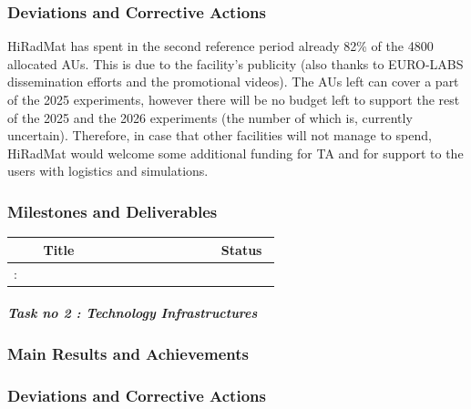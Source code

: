\subsubsection*{Deviations and Corrective Actions}

HiRadMat has spent in the second reference period already 82\% of the 4800 allocated AUs. This is due to the facility's publicity (also thanks to EURO-LABS dissemination efforts and the promotional videos). The AUs left can cover a part of the 2025 experiments, however there will be no budget left to support the rest of the 2025 and the 2026 experiments (the number of which is, currently uncertain). Therefore, in case that other facilities will not manage to spend, HiRadMat would welcome some additional funding for TA and for support to the users with logistics and simulations. 

\subsubsection*{Milestones and Deliverables}

{\fontsize{9}{11}\selectfont
\begin{center}
  \begin{tabular}[t]{!{\color{mygray}\vrule}p{0.10\linewidth}!
  {\color{mygray}\vrule}p{0.60\linewidth}!
  {\color{mygray}\vrule}p{0.20\linewidth}!{\color{mygray}\vrule} } \hline
     & {\bf Title} & {\bf Status} \\ \hline
    : &  &  \\ \hline
  \end{tabular}
\end{center}
}

\subparagraph{Task no 2 : Technology Infrastructures} \mbox{}


\subsubsection*{Main Results and Achievements}


\subsubsection*{Deviations and Corrective Actions}

